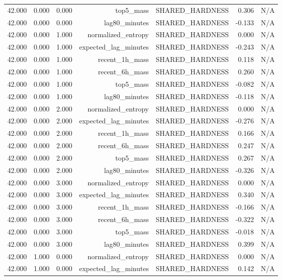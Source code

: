 \begin{table}[h!]
\begin{tabular}{lrrrrrr}
42.000 & 0.000 & 0.000 & top5\_mass & SHARED\_HARDNESS & 0.306 & N/A \\
42.000 & 0.000 & 0.000 & lag80\_minutes & SHARED\_HARDNESS & -0.133 & N/A \\
42.000 & 0.000 & 1.000 & normalized\_entropy & SHARED\_HARDNESS & 0.000 & N/A \\
42.000 & 0.000 & 1.000 & expected\_lag\_minutes & SHARED\_HARDNESS & -0.243 & N/A \\
42.000 & 0.000 & 1.000 & recent\_1h\_mass & SHARED\_HARDNESS & 0.118 & N/A \\
42.000 & 0.000 & 1.000 & recent\_6h\_mass & SHARED\_HARDNESS & 0.260 & N/A \\
42.000 & 0.000 & 1.000 & top5\_mass & SHARED\_HARDNESS & -0.082 & N/A \\
42.000 & 0.000 & 1.000 & lag80\_minutes & SHARED\_HARDNESS & -0.118 & N/A \\
42.000 & 0.000 & 2.000 & normalized\_entropy & SHARED\_HARDNESS & 0.000 & N/A \\
42.000 & 0.000 & 2.000 & expected\_lag\_minutes & SHARED\_HARDNESS & -0.276 & N/A \\
42.000 & 0.000 & 2.000 & recent\_1h\_mass & SHARED\_HARDNESS & 0.166 & N/A \\
42.000 & 0.000 & 2.000 & recent\_6h\_mass & SHARED\_HARDNESS & 0.247 & N/A \\
42.000 & 0.000 & 2.000 & top5\_mass & SHARED\_HARDNESS & 0.267 & N/A \\
42.000 & 0.000 & 2.000 & lag80\_minutes & SHARED\_HARDNESS & -0.326 & N/A \\
42.000 & 0.000 & 3.000 & normalized\_entropy & SHARED\_HARDNESS & 0.000 & N/A \\
42.000 & 0.000 & 3.000 & expected\_lag\_minutes & SHARED\_HARDNESS & 0.340 & N/A \\
42.000 & 0.000 & 3.000 & recent\_1h\_mass & SHARED\_HARDNESS & -0.166 & N/A \\
42.000 & 0.000 & 3.000 & recent\_6h\_mass & SHARED\_HARDNESS & -0.322 & N/A \\
42.000 & 0.000 & 3.000 & top5\_mass & SHARED\_HARDNESS & -0.018 & N/A \\
42.000 & 0.000 & 3.000 & lag80\_minutes & SHARED\_HARDNESS & 0.399 & N/A \\
42.000 & 1.000 & 0.000 & normalized\_entropy & SHARED\_HARDNESS & 0.000 & N/A \\
42.000 & 1.000 & 0.000 & expected\_lag\_minutes & SHARED\_HARDNESS & 0.142 & N/A \\

\end{tabular}
\end{table}
